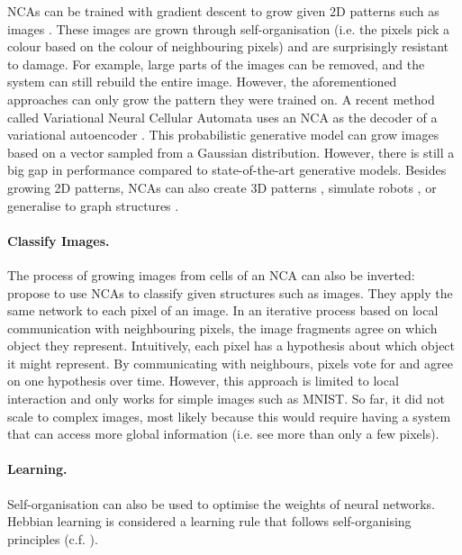 NCAs can be trained with gradient descent to grow given 2D patterns such as images .
These images are grown through self-organisation (i.e. the pixels pick a colour based on the colour of neighbouring pixels) and are surprisingly resistant to damage.
For example, large parts of the images can be removed, and the system can still rebuild the entire image.
However, the aforementioned approaches can only grow the pattern they were trained on.
A recent method called Variational Neural Cellular Automata  uses an NCA as the decoder of a variational autoencoder \cite{kingma_auto-encoding_2022}.
This probabilistic generative model can grow images based on a vector sampled from a Gaussian distribution.
However, there is still a big gap in performance compared to state-of-the-art generative models.
Besides growing 2D patterns, NCAs can also create 3D patterns , simulate robots , or generalise to graph structures .

\paragraph{Classify Images.} The process of growing images from cells of an NCA can also be inverted:
 propose to use NCAs to classify given structures such as images.
They apply the same network to each pixel of an image.
In an iterative process based on local communication with neighbouring pixels, the image fragments agree on which object they represent.
Intuitively, each pixel has a hypothesis about which object it might represent. By communicating with neighbours, pixels vote for and agree on one hypothesis over time.
However, this approach is limited to local interaction and only works for simple images such as MNIST. So far, it did not scale to complex images, most likely because this would require having a system that can access more global information (i.e. see more than only a few pixels).

\paragraph{Learning.} Self-organisation can also be used to optimise the weights of neural networks.
Hebbian learning is considered a learning rule that follows self-organising principles  (c.f. ).

